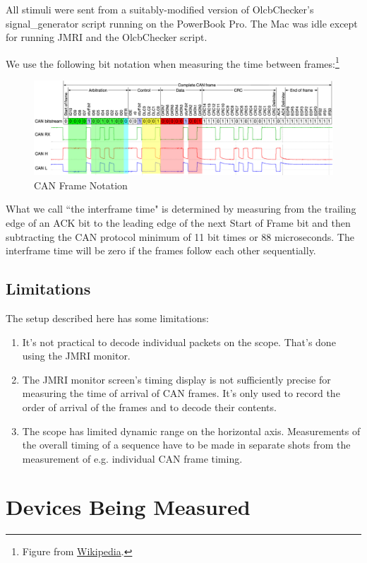 \documentclass[11pt]{article}
\begin{document}
All stimuli were sent from a suitably-modified version of
OlcbChecker’s signal\_generator script
running on the PowerBook Pro.  
The Mac was idle except for running JMRI and the OlcbChecker script.  

We use the following bit notation when measuring the time between frames:\footnote{Figure from 
\href{https://en.wikipedia.org/wiki/CAN_bus}{Wikipedia}. }
\begin{figure}[!htbp]
\centering
\includegraphics[width=1.0\linewidth]{CAN-bus-frame}
\caption{CAN Frame Notation}
\label{fig:CAN_frame}
\end{figure}

What we call ``the interframe time" is determined
by measuring from the trailing edge of an ACK bit
to the leading edge of the next Start of Frame bit and then subtracting the 
CAN protocol minimum of
11 bit times or 88 microseconds.
The interframe time will be zero if the frames follow each other sequentially. 

\subsection{Limitations}
The setup described here has some limitations:
\begin{enumerate}
\item It's not practical to decode individual packets on the scope.  That's done 
    using the JMRI monitor.
\item The JMRI monitor screen's timing display is not sufficiently precise
    for measuring the time of arrival of CAN frames. 
    It's only used to record the order of arrival of the frames and to decode their contents.
\item The scope has limited dynamic range on the horizontal axis.  Measurements of 
    the overall timing of a sequence have to be made in separate shots from
    the measurement of e.g. individual CAN frame timing.
\end{enumerate}

\section{Devices Being Measured}
\end{document}
